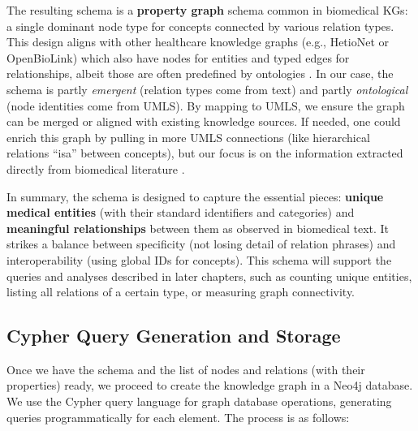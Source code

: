 The resulting schema is a \textbf{property graph} schema common in biomedical KGs: a single dominant node type for concepts connected by various relation types. This design aligns with other healthcare knowledge graphs (e.g., HetioNet or OpenBioLink) which also have nodes for entities and typed edges for relationships, albeit those are often predefined by ontologies \parencite{Himmelstein2017}. In our case, the schema is partly \textit{emergent} (relation types come from text) and partly \textit{ontological} (node identities come from UMLS). By mapping to UMLS, we ensure the graph can be merged or aligned with existing knowledge sources. If needed, one could enrich this graph by pulling in more UMLS connections (like hierarchical relations ``isa'' between concepts), but our focus is on the information extracted directly from biomedical literature \parencite{Cowell2020}.

In summary, the schema is designed to capture the essential pieces: \textbf{unique medical entities} (with their standard identifiers and categories) and \textbf{meaningful relationships} between them as observed in biomedical text. It strikes a balance between specificity (not losing detail of relation phrases) and interoperability (using global IDs for concepts). This schema will support the queries and analyses described in later chapters, such as counting unique entities, listing all relations of a certain type, or measuring graph connectivity.

\subsection{Cypher Query Generation and Storage}

Once we have the schema and the list of nodes and relations (with their properties) ready, we proceed to create the knowledge graph in a Neo4j database. We use the Cypher query language for graph database operations, generating queries programmatically for each element. The process is as follows:

